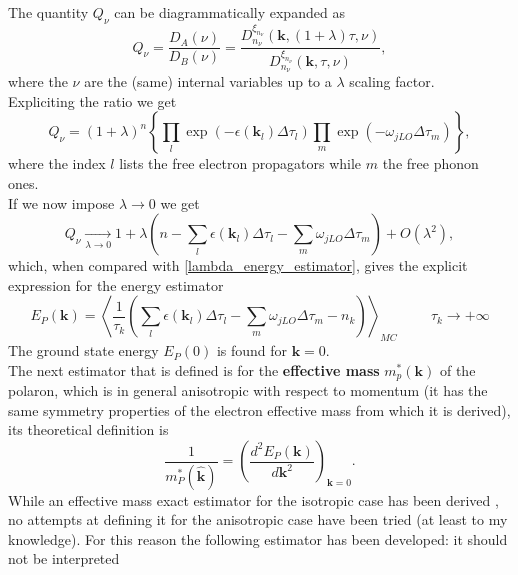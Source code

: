 The quantity $Q_\nu$ can be diagrammatically expanded as
\begin{equation}
    Q_\nu=\frac{D_A(\nu)}{D_B(\nu)}=\frac{D_{n_\nu}^{\xi_{n_\nu}}(\mathbf{k},(1+\lambda)\tau,\nu)}{D_{n_\nu}^{\xi_{n_\nu}}(\mathbf{k},\tau,\nu)},
\end{equation}
where the $\nu$ are the (same) internal variables up to a $\lambda$ scaling factor.\\
Expliciting the ratio we get
\begin{equation}
    Q_\nu=(1+\lambda)^n\left\{\prod_{l}\exp{\left(-\epsilon(\mathbf{k}_l)\Delta\tau_l\right)}\prod_{m}\exp{\left(-\omega_{jLO}\Delta\tau_m\right)}\right\},
    \label{decomposition_estimator_energy}
\end{equation}
where the index $l$ lists the free electron propagators while $m$ the free phonon ones.\\
If we now impose $\lambda\to 0$ we get
\begin{equation}
    Q_\nu \xrightarrow[\lambda\to 0]{}1+\lambda\left(n-\sum_l\epsilon(\mathbf{k}_l)\Delta\tau_l-\sum_m\omega_{jLO}\Delta\tau_m\right)+O(\lambda^2),
\end{equation}
which, when compared with \ref{lambda_energy_estimator}, gives the explicit expression for the energy estimator
\begin{equation}
    E_P(\mathbf{k})=\left\langle \frac{1}{\tau_k} \left(\sum_l\epsilon(\mathbf{k}_l)\Delta\tau_l-\sum_m\omega_{jLO}\Delta\tau_m-n_k\right) \right\rangle_{MC}\hspace{1cm}\tau_k\to+\infty
    \label{energy_estimator_MC}
\end{equation}
The ground state energy $E_P(0)$ is found for $\mathbf{k}=0$.\\
The next estimator that is defined is for the \textbf{effective mass} $m^*_p(\mathbf{k})$ of the polaron, which is in general anisotropic with respect to momentum (it 
has the same symmetry properties of the electron effective mass from which it is derived), its theoretical definition is
\begin{equation}
    \frac{1}{m^*_P(\hat{\mathbf{k}})}=\left(\frac{d^2 E_P(\mathbf{k})}{d{\mathbf{k}^2}}\right)_{\mathbf{k}=0}.
\end{equation}
While an effective mass exact estimator for the isotropic case has been derived \cite{mishchenko2000diagrammatic}, no attempts at defining it for the anisotropic 
case have been tried (at least to my knowledge). For this reason the following estimator has been developed: it should not be interpreted 
